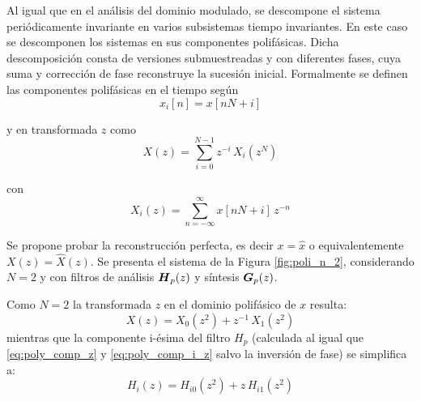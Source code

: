 
	Al igual que en el análisis del dominio modulado, se descompone el sistema periódicamente 
	invariante en varios subsistemas tiempo invariantes. En este caso se descomponen los sistemas en sus componentes polifásicas. 
	Dicha descomposición consta de versiones submuestreadas y con diferentes fases, cuya suma y corrección de fase reconstruye la sucesión inicial.
	Formalmente se definen las componentes polifásicas en el tiempo según
		\begin{equation}
			x_i[n] = x[nN+i]
			\label{eq:poly_comp}
		\end{equation}
		
		y en transformada $z$ como 
		\begin{equation} %
			X(z)= \sum^{N-1}_{i=0} z^{-i} \, X_i(z^N)
			\label{eq:poly_comp_z}
		\end{equation}
		
		con
		\begin{equation} %
			X_i(z)=\sum^{\infty}_{n=-\infty} x[nN+ i]\, z^{-n}
			\label{eq:poly_comp_i_z}
		\end{equation}

	Se propone probar la reconstrucción perfecta, es decir $x = \hat{x}$ o equivalentemente $X(z) = \hat{X}(z)$. Se presenta el sistema de la Figura \ref{fig:poli_n_2}, considerando $N=2$ y con filtros de análisis $\boldsymbol{H}_p(z)$ y síntesis $\boldsymbol{G}_p(z)$. 

	Como $N=2$ la transformada $z$ en el dominio polifásico de $x$ resulta:
		\begin{equation}
			X(z) = X_0 (z^2) + z^{-1}\, X_1 (z^2)
			\label{eq:xp_z}
		\end{equation}
	mientras que la componente i-ésima del filtro $H_p$ (calculada al igual que \eqref{eq:poly_comp_z} y \eqref{eq:poly_comp_i_z} salvo la inversión de fase) se simplifica a:
		\begin{equation}
			H_i(z) = H_{i0} (z^2) + z\, H_{i1} (z^2)
			\label{eq:hpi_z}
		\end{equation}

